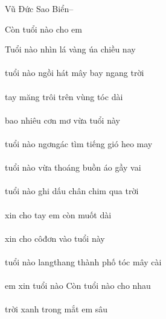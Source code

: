 \documentclass[14pt,a4paper]{extarticle}
\begin{document}
\bigskip


Vũ Đức Sao Biển\qquad  --


\newpage 

Còn tuổi nào cho em\medskip 

{\Huge {}   \cho \em} \vspace*{2cm}



Tuổi nào nhìn lá vàng úa chiều nay\\[1ex]
{\Huge {}       \nay}\\[1ex]
tuổi nào ngồi hát mây bay ngang trời\\[1ex]
{\Huge {}     \bay \ngang {}}\\[1ex]
tay măng trôi trên vùng tóc dài\\[1ex]
{\Huge \tay {}     }\\[1ex]
bao nhiêu cơn mơ vừa tuổi này\\[1ex]
{\Huge \bao {}     }\\[1ex]
tuổi nào ngơngác tìm tiếng gió heo may\\[1ex]
{\Huge {}      \heomay}\\[1ex]
tuổi nào vừa thoáng buồn áo gầy vai\\[1ex]
{\Huge {}       \vai}\\[1ex]
tuổi nào ghi dấu chân chim qua trời\\[1ex]
{\Huge {}  \ghi {}  \chim \qua {}}\\[1ex]
xin cho tay em còn muốt dài\\[1ex]
{\Huge \xin \cho \tay \em {} 
}\\[1ex]
xin cho côđơn vào tuổi này\\[1ex]
{\Huge \xin \cho {}   }\\[1ex]
tuổi nào langthang thành phố tóc mây cài\\[1ex]
{\Huge {}  \langthang {}   }\\[1ex]
em xin tuổi nào Còn tuổi nào cho nhau\\[1ex]
{\Huge \em \xin {}     \cho \nhau}\\[1ex]
trời xanh trong mắt em sâu\\[1ex]
{\Huge {} \xanh \trong {} \em {}}\\[1ex]
\end{document}
